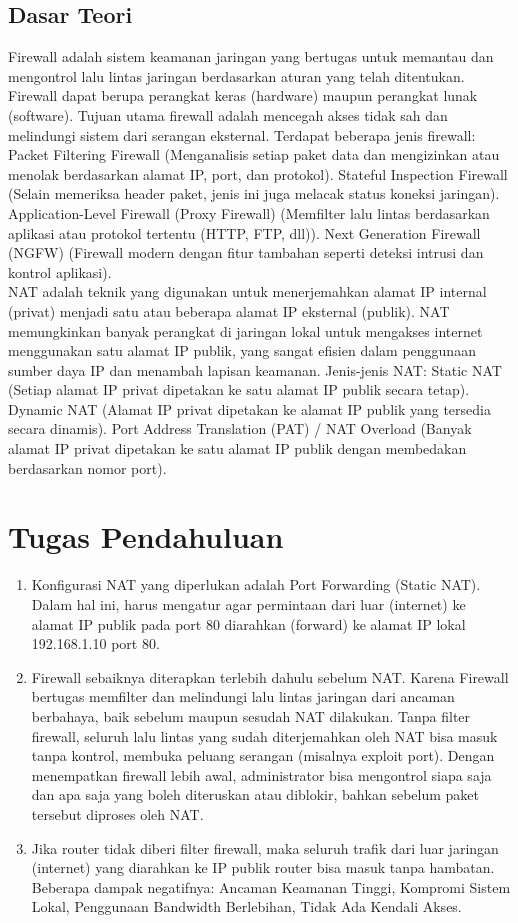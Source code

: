 \subsection{Dasar Teori}
Firewall adalah sistem keamanan jaringan yang bertugas untuk memantau dan mengontrol lalu lintas jaringan berdasarkan aturan yang telah ditentukan. Firewall dapat berupa perangkat keras (hardware) maupun perangkat lunak (software). Tujuan utama firewall adalah mencegah akses tidak sah dan melindungi sistem dari serangan eksternal. Terdapat beberapa jenis firewall: Packet Filtering Firewall (Menganalisis setiap paket data dan mengizinkan atau menolak berdasarkan alamat IP, port, dan protokol). Stateful Inspection Firewall (Selain memeriksa header paket, jenis ini juga melacak status koneksi jaringan). Application-Level Firewall (Proxy Firewall) (Memfilter lalu lintas berdasarkan aplikasi atau protokol tertentu (HTTP, FTP, dll)). Next Generation Firewall (NGFW) (Firewall modern dengan fitur tambahan seperti deteksi intrusi dan kontrol aplikasi). \\ NAT adalah teknik yang digunakan untuk menerjemahkan alamat IP internal (privat) menjadi satu atau beberapa alamat IP eksternal (publik). NAT memungkinkan banyak perangkat di jaringan lokal untuk mengakses internet menggunakan satu alamat IP publik, yang sangat efisien dalam penggunaan sumber daya IP dan menambah lapisan keamanan. Jenis-jenis NAT: Static NAT (Setiap alamat IP privat dipetakan ke satu alamat IP publik secara tetap). Dynamic NAT (Alamat IP privat dipetakan ke alamat IP publik yang tersedia secara dinamis). Port Address Translation (PAT) / NAT Overload (Banyak alamat IP privat dipetakan ke satu alamat IP publik dengan membedakan berdasarkan nomor port).

\section{Tugas Pendahuluan}
\begin{enumerate}
	\item Konfigurasi NAT yang diperlukan adalah Port Forwarding (Static NAT). Dalam hal ini, harus mengatur agar permintaan dari luar (internet) ke alamat IP publik pada port 80 diarahkan (forward) ke alamat IP lokal 192.168.1.10 port 80.
	\item Firewall sebaiknya diterapkan terlebih dahulu sebelum NAT. Karena Firewall bertugas memfilter dan melindungi lalu lintas jaringan dari ancaman berbahaya, baik sebelum maupun sesudah NAT dilakukan. Tanpa filter firewall, seluruh lalu lintas yang sudah diterjemahkan oleh NAT bisa masuk tanpa kontrol, membuka peluang serangan (misalnya exploit port). Dengan menempatkan firewall lebih awal, administrator bisa mengontrol siapa saja dan apa saja yang boleh diteruskan atau diblokir, bahkan sebelum paket tersebut diproses oleh NAT.
	 \item Jika router tidak diberi filter firewall, maka seluruh trafik dari luar jaringan (internet) yang diarahkan ke IP publik router bisa masuk tanpa hambatan. Beberapa dampak negatifnya: Ancaman Keamanan Tinggi, Kompromi Sistem Lokal, Penggunaan Bandwidth Berlebihan, Tidak Ada Kendali Akses.
\end{enumerate}